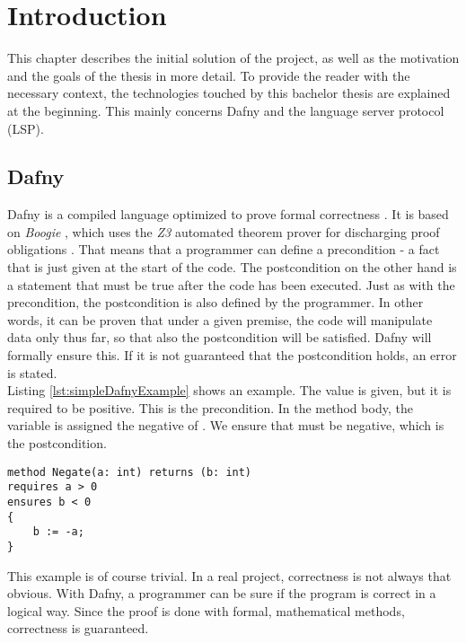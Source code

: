 \section{Introduction}

\label{section:introduction}
This chapter describes the initial solution of the project, as well as the motivation and the goals of the thesis in more detail.
To provide the reader with the necessary context, the technologies touched by this bachelor thesis are explained at the beginning.
This mainly concerns Dafny and the language server protocol (LSP).

\subsection{Dafny}
\label{section:introduction:dafny}
Dafny is a compiled language optimized to prove formal correctness \cite{dafnyWiki}.
It is based on \textit{Boogie} \cite{boogie}, which uses the \textit{Z3} \cite{z3} automated theorem prover for discharging proof obligations \cite{dafnyWiki}.  
That means that a programmer can define a precondition - a fact that is just given at the start of the code.
The postcondition on the other hand is a statement that must be true after the code has been executed.
Just as with the precondition, the postcondition is also defined by the programmer.
In other words, it can be proven that under a given premise, the code will manipulate data only thus far, so that also the postcondition will be satisfied.
Dafny will formally ensure this.
If it is not guaranteed that the postcondition holds, an error is stated.\\

Listing \ref{lst:simpleDafnyExample} shows an example.
The value  is given, but it is required to be positive.
This is the precondition.
In the method body, the variable  is assigned the negative of .
We ensure that  must be negative, which is the postcondition.
\begin{lstlisting}[language=dafny, caption={Simple Dafny Example}, captionpos=b, label={lst:simpleDafnyExample}]
method Negate(a: int) returns (b: int)
requires a > 0
ensures b < 0
{
    b := -a;
}
\end{lstlisting}
This example is of course trivial.
In a real project, correctness is not always that obvious.
With Dafny, a programmer can be sure if the program is correct in a logical way.
Since the proof is done with formal, mathematical methods, correctness is guaranteed.\\

